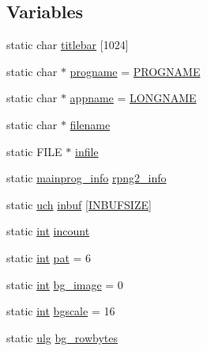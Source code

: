 \subsection*{Variables}
\begin{DoxyCompactItemize}
\item 
static char \mbox{\hyperlink{rpng2-win_8c_a7d71fb2a6cfb5d27855f58bc7e548978}{titlebar}} \mbox{[}1024\mbox{]}
\item 
static char $\ast$ \mbox{\hyperlink{rpng2-win_8c_ab9e1449fd00c98428516f0b41eddcb10}{progname}} = \mbox{\hyperlink{_visual_png_8c_a8c9afb758de9a0355c93fc926b8ce6b1}{P\+R\+O\+G\+N\+A\+ME}}
\item 
static char $\ast$ \mbox{\hyperlink{rpng2-win_8c_a9db0329b02c3e8e0260939a1c680738a}{appname}} = \mbox{\hyperlink{_visual_png_8c_ae8176192ea4d52bb0acbcfeaaffb3bd8}{L\+O\+N\+G\+N\+A\+ME}}
\item 
static char $\ast$ \mbox{\hyperlink{rpng2-win_8c_aeac90097f29f7529968697163cea5c18}{filename}}
\item 
static F\+I\+LE $\ast$ \mbox{\hyperlink{rpng2-win_8c_af19157da745ecb3f2b088c8f3a10c0a7}{infile}}
\item 
static \mbox{\hyperlink{readpng2_8h_a1b06d069c8b16f46dd13c65e745bbdcb}{mainprog\+\_\+info}} \mbox{\hyperlink{rpng2-win_8c_a620379ebfcc5817eef3e6a063e83f64f}{rpng2\+\_\+info}}
\item 
static \mbox{\hyperlink{readpng_8h_af3307af5922c72924a837559c801a8a4}{uch}} \mbox{\hyperlink{rpng2-win_8c_a82a0c3437e717af50ffb2c5244a611dd}{inbuf}} \mbox{[}\mbox{\hyperlink{rpng2-x_8c_ab3f00dac33458432279d4308226d8413}{I\+N\+B\+U\+F\+S\+I\+ZE}}\mbox{]}
\item 
static \mbox{\hyperlink{ioapi_8h_a787fa3cf048117ba7123753c1e74fcd6}{int}} \mbox{\hyperlink{rpng2-win_8c_aeb67c5d07a9a094de6dc172d6ef53766}{incount}}
\item 
static \mbox{\hyperlink{ioapi_8h_a787fa3cf048117ba7123753c1e74fcd6}{int}} \mbox{\hyperlink{rpng2-win_8c_a0e13c5b1758f3abeec1855394c921107}{pat}} = 6
\item 
static \mbox{\hyperlink{ioapi_8h_a787fa3cf048117ba7123753c1e74fcd6}{int}} \mbox{\hyperlink{rpng2-win_8c_a1f95a8a8bfcf398fe6d4b23eb958f064}{bg\+\_\+image}} = 0
\item 
static \mbox{\hyperlink{ioapi_8h_a787fa3cf048117ba7123753c1e74fcd6}{int}} \mbox{\hyperlink{rpng2-win_8c_ab2bd2b176aeae12a23126f93e3ccab33}{bgscale}} = 16
\item 
static \mbox{\hyperlink{readpng_8h_abd6f60bf9450af2ecb94097a32c19a64}{ulg}} \mbox{\hyperlink{rpng2-win_8c_a87b93a760b02367b4454818bce11ac88}{bg\+\_\+rowbytes}}

\end{DoxyCompactItemize}
